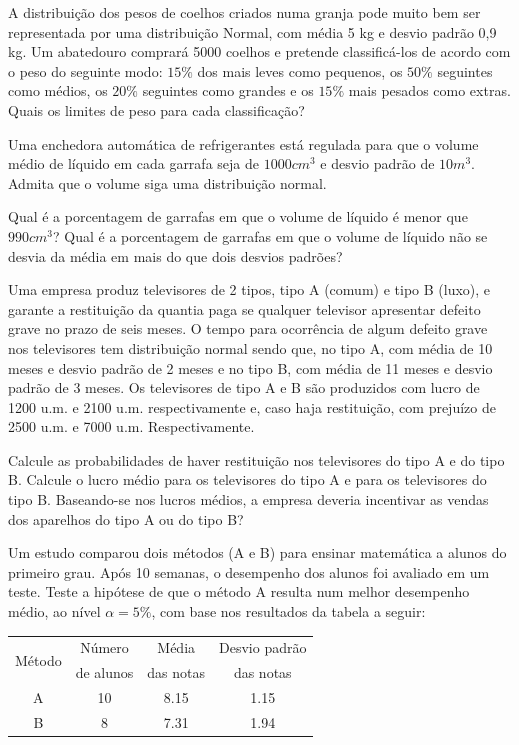 \documentclass{report}
\begin{document}
\begin{Exercise}
\Question A distribuição dos pesos de coelhos criados numa granja pode muito bem ser representada por uma distribuição Normal, com média 5 kg e desvio padrão 0,9 kg. 
Um abatedouro comprará 5000 coelhos e pretende classificá-los de acordo com o peso do seguinte modo: $15\%$ dos mais leves como pequenos, os $50\%$ seguintes 
como médios, os $20\%$ seguintes como grandes e os $15\%$ mais pesados como extras. Quais os limites de peso para cada classificação?

\Question Uma enchedora automática de refrigerantes está regulada para que o volume médio de líquido em cada garrafa seja de $1000 cm^{3}$ e desvio padrão de $10 m^{3}$. 
Admita que o volume siga uma distribuição normal.
\begin{tasks}
\task Qual é a porcentagem de garrafas em que o volume de líquido é menor que $990 cm^{3}$?
\task Qual é a porcentagem de garrafas em que o volume de líquido não se desvia da média em mais do que dois desvios padrões?
\end{tasks}

\Question Uma empresa produz televisores de 2 tipos, tipo A (comum) e tipo B (luxo), e garante a restituição da quantia paga se qualquer televisor apresentar defeito 
grave no prazo de seis meses. O tempo para ocorrência de algum defeito grave nos televisores tem distribuição normal sendo que, no tipo A, com média de 10 meses 
e desvio padrão de 2 meses e no tipo B, com média de 11 meses e desvio padrão de 3 meses. Os televisores de tipo A e B são produzidos com lucro  de 1200 u.m. e 
2100 u.m. respectivamente e, caso haja restituição, com prejuízo de 2500 u.m. e 7000 u.m. Respectivamente.
\begin{tasks}
\task Calcule as probabilidades de haver restituição nos televisores do tipo A e do tipo B.
\task Calcule o lucro médio para os televisores do tipo A e para os televisores do tipo B.
\task Baseando-se nos lucros médios, a empresa deveria incentivar as vendas dos aparelhos do tipo A ou do tipo B?
\end{tasks}

\Question Um estudo comparou dois métodos (A e B) para ensinar matemática a alunos do primeiro grau. Após 10 semanas, o desempenho dos alunos foi 
avaliado em um teste. Teste a hipótese de que o método A resulta num melhor desempenho médio, ao nível $\alpha=5\%$, com base nos resultados da tabela a seguir:

\begin{table}[H]
\centering
\begin{tabular}{cccc}
\hline \hline
\multirow{2}{*}{Método}&Número   &Média      &Desvio padrão\\
                                       &de alunos&das notas&das notas        \\
\hline\hline
                                     A& 10           &8.15        &1.15                 \\
                                     B&   8           &7.31        &1.94                 \\
\hline \hline
\end{tabular}
\end{table}


\end{Exercise}
\end{document}

